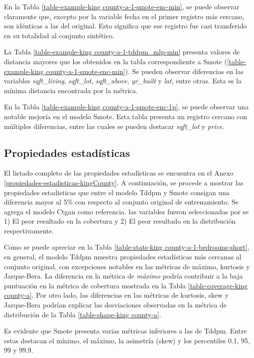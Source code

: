 En la Tabla \ref{table-example-king county-a-1-smote-enc-min}, se puede observar claramente que, excepto por la variable fecha en el primer registro más cercano, son idénticas a las del original. Esto significa que ese registro fue casi transferido en su totalidad al conjunto sintético. 


\newpage
La Tabla \ref{table-example-king county-a-1-tddpm_mlp-min} presenta valores de distancia mayores que los obtenidos en la tabla correspondiente a Smote (\ref{table-example-king county-a-1-smote-enc-min}). Se pueden observar diferencias en las variables \emph{sqft\_living}, \emph{sqft\_lot}, \emph{sqft\_above}, \emph{yr\_built} y \emph{lat}, entre otras. Esta es la mínima distancia encontrada por la métrica.

\newpage
En la Tabla \ref{table-example-king county-a-1-smote-enc-1p}, se puede observar una notable mejoría en el modelo Smote. Esta tabla presenta un registro cercano con múltiples diferencias, entre las cuales se pueden destacar \emph{sqft\_lot} y \emph{price}.

\newpage
\subsection{Propiedades estadísticas}
\label{propiedades-kingcounty}
El listado completo de las propiedades estadísticas se encuentra en el Anexo \ref{propiedades-estadisticas-kingCounty}. A continuación, se procede a mostrar las propiedades estadisticas que entre el modelo Tddpm y Smote consigan una diferencia mayor al 5\% con respecto al conjunto original de entrenamiento. Se agrega el modelo Ctgan como referencia. las variables fueron seleccionadas por se 1) El peor resultado en la cobertura y 2) El peor resultado en la distribución respectivamente.

Como se puede apreciar en la Tabla \ref{table-stats-king county-a-1-bedrooms-short}, en general, el modelo Tddpm muestra propiedades estadísticas más cercanas al conjunto original, con excepciones notables en las métricas de máximo, kurtosis y Jarque-Bera. La diferencia en la métrica de \emph{máximo} podría contribuir a la baja puntuación en la métrica de cobertura mostrada en la Tabla \ref{table-coverage-king county-a}. Por otro lado, las diferencias en las métricas de kurtosis, skew y Jarque-Bera podrían explicar las desviaciones observadas en la métrica de distribución de la Tabla \ref{table-shape-king county-a}.

\newpage
Es evidente que Smote presenta varias métricas inferiores a las de Tddpm. Entre estas destacan el mínimo, el máximo, la asimetría (skew) y los percentiles 0.1, 95, 99 y 99.9.


